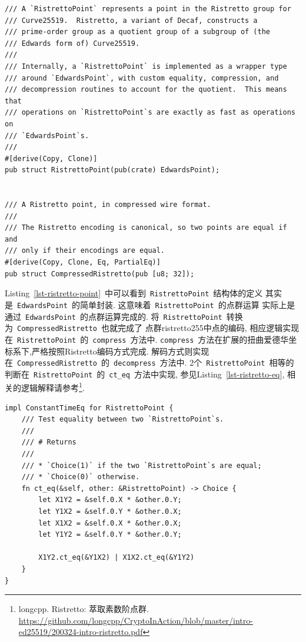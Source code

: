 \documentclass{article}
\newcommand{\code}[1]{\lstinline!#1!}
\begin{document}
\begin{lstlisting}[caption=\code{RistrettoPoint}~和~\code{CompressedRistretto}~定义, label=lst-ristretto-point]
/// A `RistrettoPoint` represents a point in the Ristretto group for
/// Curve25519.  Ristretto, a variant of Decaf, constructs a
/// prime-order group as a quotient group of a subgroup of (the
/// Edwards form of) Curve25519.
///
/// Internally, a `RistrettoPoint` is implemented as a wrapper type
/// around `EdwardsPoint`, with custom equality, compression, and
/// decompression routines to account for the quotient.  This means that
/// operations on `RistrettoPoint`s are exactly as fast as operations on
/// `EdwardsPoint`s.
///
#[derive(Copy, Clone)]
pub struct RistrettoPoint(pub(crate) EdwardsPoint);


/// A Ristretto point, in compressed wire format.
///
/// The Ristretto encoding is canonical, so two points are equal if and
/// only if their encodings are equal.
#[derive(Copy, Clone, Eq, PartialEq)]
pub struct CompressedRistretto(pub [u8; 32]);
\end{lstlisting}

Listing~\ref{lst-ristretto-point}~中可以看到~\code{RistrettoPoint}~结构体的定义
其实是~\code{EdwardsPoint}~的简单封装. 这意味着~\code{RistrettoPoint}~的点群运算
实际上是通过~\code{EdwardsPoint}~的点群运算完成的.
将~\code{RistrettoPoint}~转换为~\code{CompressedRistretto}~也就完成了
点群\textsf{ristretto255}中点的编码, 
相应逻辑实现在~\code{RistrettoPoint}~的~\code{compress}~方法中.
\code{compress}~方法在扩展的扭曲爱德华坐标系下,严格按照Ristretto编码方式完成.
解码方式则实现在~\code{CompressedRistretto}~的~\code{decompress}~方法中.
2个~\code{RistrettoPoint}~相等的判断在~\code{RistrettoPoint}~的~\code{ct_eq}~方法中实现,
参见Listing~\ref{lst-ristretto-eq}, 相关的逻辑解释请参考\footnote{longcpp. Ristretto: 萃取素数阶点群.
\url{https://github.com/longcpp/CryptoInAction/blob/master/intro-ed25519/200324-intro-ristretto.pdf}}.

\begin{lstlisting}[caption=\code{RistrettoPoint}~的~\code{ct_eq}~方法, label=lst-ristretto-eq]
impl ConstantTimeEq for RistrettoPoint {
    /// Test equality between two `RistrettoPoint`s.
    ///
    /// # Returns
    ///
    /// * `Choice(1)` if the two `RistrettoPoint`s are equal;
    /// * `Choice(0)` otherwise.
    fn ct_eq(&self, other: &RistrettoPoint) -> Choice {
        let X1Y2 = &self.0.X * &other.0.Y;
        let Y1X2 = &self.0.Y * &other.0.X;
        let X1X2 = &self.0.X * &other.0.X;
        let Y1Y2 = &self.0.Y * &other.0.Y;

        X1Y2.ct_eq(&Y1X2) | X1X2.ct_eq(&Y1Y2)
    }
}
\end{lstlisting}
\end{document}
